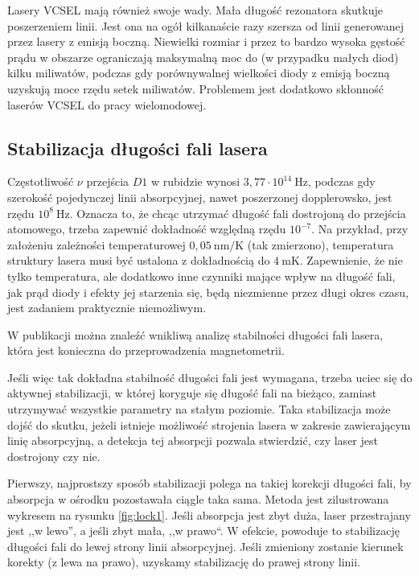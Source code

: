 \documentclass[a4paper,10pt,twoside]{article}
\begin{document}
Lasery VCSEL mają również swoje wady. Mała długość rezonatora skutkuje poszerzeniem linii. Jest ona na ogół kilkanaście razy szersza od linii generowanej przez lasery z emisją boczną. Niewielki rozmiar i przez to bardzo wysoka gęstość prądu w obszarze ograniczają maksymalną moc do (w przypadku małych diod) kilku miliwatów, podczas gdy porównywalnej wielkości diody z emisją boczną uzyskują moce rzędu setek miliwatów. Problemem jest dodatkowo skłonność laserów VCSEL do pracy wielomodowej.


\subsection{Stabilizacja długości fali lasera}

Częstotliwość $\nu$ przejścia $D1$ w rubidzie wynosi $3{,}77 \cdot 10^{14}~
\mathrm{Hz}$, podczas gdy szerokość pojedynczej linii absorpcyjnej,
nawet poszerzonej dopplerowsko, jest rzędu $10^8~\mathrm{Hz}$. Oznacza to, że 
chcąc utrzymać długość fali dostrojoną do przejścia atomowego,
trzeba zapewnić dokładność względną rzędu $10^{-7}$. Na przykład, przy założeniu zależności temperaturowej $0{,}05 ~\mathrm{nm/K}$ (tak zmierzono), temperatura struktury lasera musi być ustalona z dokładnością do $4~\mathrm{mK}$. Zapewnienie,
że nie tylko temperatura, ale dodatkowo inne czynniki mające wpływ na długość fali, jak prąd diody i efekty jej 
starzenia się, będą niezmienne przez długi okres czasu, jest zadaniem 
praktycznie niemożliwym.

W publikacji \cite{sensitivity} można znaleźć wnikliwą analizę stabilności długości fali lasera, która jest konieczna do przeprowadzenia magnetometrii. 

Jeśli więc tak dokładna stabilność długości fali jest wymagana, trzeba uciec się do aktywnej 
stabilizacji, w której koryguje się długość fali na bieżąco, zamiast utrzymywać 
wszystkie parametry na stałym poziomie.
Taka stabilizacja może dojść do skutku, jeżeli istnieje możliwość strojenia 
lasera w zakresie zawierającym linię absorpcyjną, a detekcja tej absorpcji pozwala stwierdzić, czy laser jest dostrojony czy nie.

Pierwszy, najprostszy sposób stabilizacji polega na takiej korekcji długości 
fali, by absorpcja w ośrodku pozostawała ciągle taka sama.
Metoda jest zilustrowana wykresem na rysunku \ref{fig:lock1}. Jeśli absorpcja 
jest zbyt duża, laser przestrajany jest ,,w lewo'', a jeśli zbyt mała, ,,w 
prawo``.
W efekcie, powoduje to stabilizację długości fali do lewej strony linii absorpcyjnej.
Jeśli zmieniony zostanie kierunek korekty (z lewa na prawo), uzyskamy stabilizację do prawej strony linii.
\end{document}
